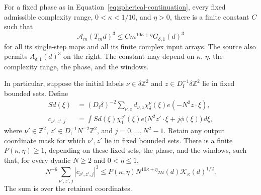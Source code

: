 \begin{theorem}
\label{thm:packet}
For a fixed phase as in Equation~\eqref{eq:spherical-continuation},
every fixed admissible complexity range, $0<\kappa<1/10$, and
$\eta>0$, there is a finite constant $C$ such that
\begin{equation}\label{eq:packet-source}
 \mathcal A_m(T_md)^3
       \le C m^{10\kappa+\eta}G_{\delta,1}(d)^3
\end{equation}
for all its single-step maps and all its finite complex input
arrays.  The source also permits $A_{\delta,1}(d)^3$ on the right.
The constant may depend on $\kappa$, $\eta$, the complexity
range, the phase, and the windows.

In particular, suppose the initial labels
$\nu\in\delta\mathbb Z^2$ and
$z\in D_{\mathrm f}^{-1}\delta\mathbb Z^2$ lie in fixed bounded
sets.  Define
\begin{align}
 S d(\xi)
 &=(D_{\mathrm f}\delta)^{-2}
     \sum_{\nu,z}d_{\nu,z}\chi_\delta^\nu(\xi)
                               e(-N^2z\cdot\xi),
                     \label{eq:packet-synthesis}\\
 c_{\nu',z',j}
 &=\int Sd(\xi)\chi_1^{\nu'}(\xi)
                 e\bigl(N^2z'\cdot\xi+j\phi(\xi)\bigr)\,d\xi,
                     \label{eq:packet-samples}
\end{align}
where $\nu'\in\mathbb Z^2$,
$z'\in D_{\mathrm f}^{-1}N^{-2}\mathbb Z^2$, and
$j=0,\ldots,N^2-1$.  Retain any output coordinate mask for which
$\nu',z'$ lie in fixed bounded sets.  There is a finite
$P(\kappa,\eta)\ge1$, depending on these fixed sets, the phase,
and the windows, such that, for every dyadic $N\ge2$ and
$0<\eta\le1$,
\begin{equation}\label{eq:packet-bound}
 N^{-6}\sum_{\nu',z',j}|c_{\nu',z',j}|^3
 \le P(\kappa,\eta)N^{10\kappa+\eta}
                  m(d)\mathcal K_\kappa(d)^{1/2}.
\end{equation}
The sum is over the retained coordinates.
\end{theorem}

